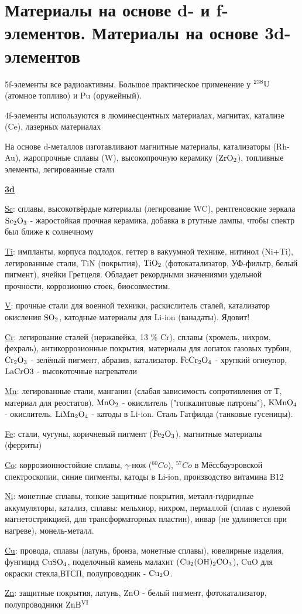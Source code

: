 \section{Материалы на основе d- и f- элементов. Материалы на основе 3d-элементов}
5f-элементы все радиоактивны. Большое практическое применение у $\rm {}^{238}U$ (атомное топливо) и Pu (оружейный). \par
4f-элементы используются в люминесцентных материалах, магнитах, катализе (Ce), лазерных материалах
\par На  основе d-металлов изготавливают магнитные материалы, катализаторы (Rh-Au), жаропрочные сплавы (W), высокопрочную керамику ($\rm ZrO_2$), топливные элементы, легированные стали
\par \underline{\textbf{3d}}
\par \underline{Sc}: сплавы, высокотвёрдые материалы (легирование WC), рентгеновские зеркала $\rm Sc_2O_3$ - жаростойкая прочная керамика, добавка в ртутные лампы, чтобы спектр был ближе к солнечному
\par \underline{Ti}: импланты, корпуса подлодок, геттер в вакуумной технике, нитинол (Ni+Ti), легированные стали, TiN (покрытия), $\rm TiO_2$ (фотокатализатор, УФ-фильтр, белый пигмент), ячейки Гретцеля. Обладает рекордными значениями удельной прочности, коррозионно стоек, биосовместим.
\par \underline{V}: прочные стали для военной техники, раскислитель сталей, катализатор окисления $\rm SO_2$, катодные материалы для Li-ion (ванадаты). Ядовит!
\par \underline{Cr}: легирование сталей (нержавейка, 13 \% Cr), сплавы (хромель, нихром, фехраль), антикоррозионные покрытия, материалы для лопаток газовых турбин, $\rm Cr_2O_3$ - зелёный пигмент, абразив, катализатор. $\rm FeCr_2O_4$ - хрупкий огнеупор, $\rm LaCrO3$ - высокоточные нагреватели
\par \underline{Mn}: легированные стали, манганин (слабая зависимость сопротивления от Т, материал для реостатов). $\rm MnO_2$ - окислитель ("гопкалитовые патроны"), $\rm KMnO_4$ - окислитель. $\rm LiMn_2O_4$ - катоды в Li-ion. Сталь Гатфилда (танковые гусеницы).
\par \underline{Fe}: стали, чугуны, коричневый пигмент ($\rm Fe_2O_3$), магнитные материалы (ферриты)
\par \underline{Co}: коррозионностойкие сплавы, $\gamma$-нож (${}^{60}Co$),  ${}^{57}Co$ в Мёссбауэровской спектроскопии, синие пигменты, катоды в Li-ion, производство витамина B12
\par \underline{Ni}: монетные сплавы, тонкие защитные покрытия, металл-гидридные аккумуляторы, катализ, сплавы: мельхиор, нихром, пермаллой (сплав с нулевой магнетострикцией, для трансформаторных пластин), инвар (не удлиняется при нагреве), монель-металл. 
\par \underline{Cu}: провода, сплавы (латунь, бронза, монетные сплавы), ювелирные изделия, фунгицид $\rm CuSO_4$, поделочный камень малахит ($\rm Cu_2(OH)_2CO_3$), CuO для окраски стекла,ВТСП, полупроводник - $\rm Cu_2O$.
\par \underline{Zn}: защитные покрытия, латунь, ZnO - белый пигмент, фотокатализатор, полупроводники $\rm ZnB^{VI}$
